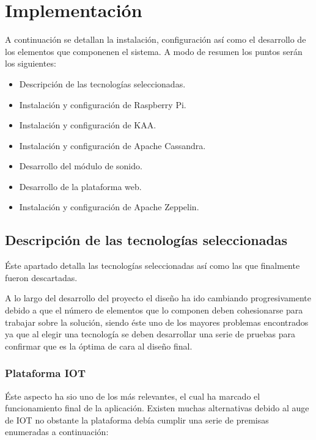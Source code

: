 \chapter{Implementación}

A continuación se detallan la instalación, configuración así como el desarrollo de los elementos que componenen el sistema. A modo de resumen los puntos serán los siguientes:

\begin{itemize}
	\item Descripción de las tecnologías seleccionadas.
	\item Instalación y configuración de Raspberry Pi.
	\item Instalación y configuración de KAA.
	\item Instalación y configuración de Apache Cassandra.
	\item Desarrollo del módulo de sonido.
	\item Desarrollo de la plataforma web.
	\item Instalación y configuración de Apache Zeppelin.
\end{itemize}

\section{ Descripción de las tecnologías seleccionadas}

Éste apartado detalla las tecnologías seleccionadas así como las que finalmente fueron descartadas.

A lo largo del desarrollo del proyecto el diseño ha ido cambiando progresivamente debido a que el número de elementos que lo componen deben cohesionarse para trabajar sobre la solución, siendo éste uno de los mayores problemas encontrados ya que al elegir una tecnología se deben desarrollar una serie de pruebas para confirmar que es la óptima de cara al diseño final.

\subsection{Plataforma IOT}

Éste aspecto ha sio uno de los más relevantes, el cual ha marcado el funcionamiento final de la aplicación. Existen muchas alternativas debido al auge de IOT no obstante la plataforma debía cumplir una serie de premisas enumeradas a continuación:

